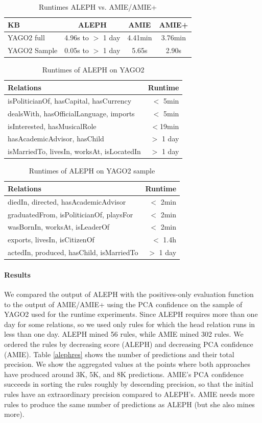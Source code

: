 \begin{table}
\begin{tabular}{l|ccc}
KB & ALEPH & AMIE & AMIE+\\
\hline
YAGO2 full & 4.96s to $>$ 1 day & 4.41min & 3.76min\\
YAGO2 Sample & 0.05s to $>$ 1 day & 5.65s & 2.90s \\
\end{tabular}
\caption{Runtimes ALEPH vs. AMIE/AMIE+}
\label{alephrun0}
\end{table}
\begin{table}[t]
 \begin{tabular}{l|r}
Relations & Runtime\\
\hline
isPoliticianOf, hasCapital, hasCurrency & $<$ 5min\\
dealsWith, hasOfficialLanguage, imports & $<$ 5min\\
isInterested, hasMusicalRole & $<$19min\\
hasAcademicAdvisor, hasChild& $>$ 1 day\\
isMarriedTo, livesIn, worksAt, isLocatedIn& $>$ 1 day\\ %
\end{tabular}
\caption{Runtimes of ALEPH on YAGO2}
\label{alephrun1}
\end{table}
\begin{table}[t]
\begin{tabular}{l|r}
Relations & Runtime\\
\hline
diedIn, directed, hasAcademicAdvisor & $<$ 2min\\
graduatedFrom, isPoliticianOf, playsFor & $<$ 2min\\
wasBornIn, worksAt, isLeaderOf &  $<$ 2min\\
exports, livesIn, isCitizenOf & $<$ 1.4h\\
actedIn, produced, hasChild, isMarriedTo & $>$ 1 day\\ %
\end{tabular}
\caption{Runtimes of ALEPH on YAGO2 sample}
\label{alephrun2}
\end{table}

\paragraph{Results}
We compared the output of ALEPH with the positives-only evaluation function to the output of AMIE/AMIE+ using the PCA
confidence on the sample of YAGO2 used for the runtime experiments.
Since ALEPH requires more than one day for some relations, so we used only rules for which the head
relation runs in less than one day.
ALEPH mined 56 rules, while AMIE mined 302 rules.
We ordered the rules by decreasing score (ALEPH) and decreasing PCA confidence (AMIE).
Table \ref{alephres} shows the number of predictions and their total precision.
We show the aggregated values at the points where both approaches have produced around 3K, 5K, and 8K predictions.
AMIE's PCA confidence succeeds in sorting the rules roughly by descending precision, so that the initial rules have an extraordinary precision 
compared to ALEPH's.
AMIE needs more rules to produce the same number of predictions as ALEPH (but she also mines more).

